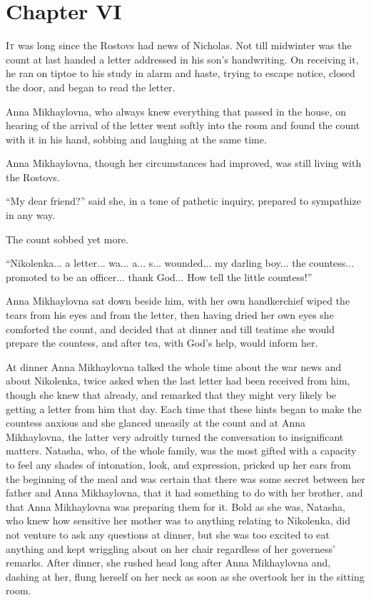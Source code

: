 \chapter*{Chapter VI}
\ifaudio     
{} 
\fi

\lettrine[lines=2, loversize=0.3, lraise=0]{\initfamily I}{t}
was long since the Rostovs had news of Nicholas. Not till
midwinter was the count at last handed a letter addressed in his
son's handwriting. On receiving it, he ran on tiptoe to his study
in alarm and haste, trying to escape notice, closed the door, and
began to read the letter.

Anna Mikhaylovna, who always knew everything that passed in the
house, on hearing of the arrival of the letter went softly into
the room and found the count with it in his hand, sobbing and
laughing at the same time.

Anna Mikhaylovna, though her circumstances had improved, was
still living with the Rostovs.

``My dear friend?'' said she, in a tone of pathetic inquiry,
prepared to sympathize in any way.

The count sobbed yet more.

``Nikolenka... a letter... wa... a... s... wounded... my darling
boy...  the countess... promoted to be an officer... thank
God... How tell the little countess!''

Anna Mikhaylovna sat down beside him, with her own handkerchief
wiped the tears from his eyes and from the letter, then having
dried her own eyes she comforted the count, and decided that at
dinner and till teatime she would prepare the countess, and after
tea, with God's help, would inform her.

At dinner Anna Mikhaylovna talked the whole time about the war
news and about Nikolenka, twice asked when the last letter had
been received from him, though she knew that already, and
remarked that they might very likely be getting a letter from him
that day. Each time that these hints began to make the countess
anxious and she glanced uneasily at the count and at Anna
Mikhaylovna, the latter very adroitly turned the conversation to
insignificant matters. Natasha, who, of the whole family, was the
most gifted with a capacity to feel any shades of intonation,
look, and expression, pricked up her ears from the beginning of
the meal and was certain that there was some secret between her
father and Anna Mikhaylovna, that it had something to do with her
brother, and that Anna Mikhaylovna was preparing them for
it. Bold as she was, Natasha, who knew how sensitive her mother
was to anything relating to Nikolenka, did not venture to ask any
questions at dinner, but she was too excited to eat anything and
kept wriggling about on her chair regardless of her governess'
remarks. After dinner, she rushed head long after Anna
Mikhaylovna and, dashing at her, flung herself on her neck as
soon as she overtook her in the sitting room.

